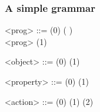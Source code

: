 \documentclass{beamer}
\begin{document}
\begin{frame}
\frametitle{A simple grammar}
\begin{grammar}
<prog>     ::=   \hfill (0) \hspace{1em}
            \alt {} \lit*(  \lit*)
              \\\lit*{\{} <prog> \lit*{\}} \hfill (1) \hspace{1em}

<object>   ::=  \hfill (0) \hspace{1em}
            \alt {} \hfill (1) \hspace{1em}

<property> ::=  \hfill (0) \hspace{1em}
            \alt {} \hfill (1) \hspace{1em}

<action>   ::=  \hfill (0) \hspace{1em}
            \alt {} \hfill (1) \hspace{1em}
            \alt {} \hfill (2) \hspace{1em} \par
\end{grammar}
\end{frame}
\end{document}
